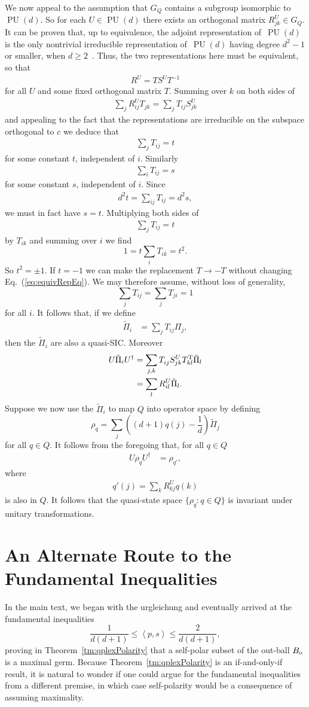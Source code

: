 \documentclass[aps,pra,superscriptaddress,10pt,tightenlines,twocolumn,nofootinbib]{revtex4}
\theoremstyle{remark}
\newcommand{\be}{\begin{equation}}
\newcommand{\ee}{\end{equation}}
\newcommand{\ea}[1]{\begin{align}#1\end{align}}
\newcommand{\vpu}[1]{^{\vphantom{#1}}}
\newcommand{\bo}{B_{\rm{o}}}
\newcommand{\qp}{Q}
\newcommand{\qgp}[1]{G_{#1}}
\newcommand{\inprod}[2]{{\left\langle #1 , #2 \right\rangle}}
\DeclareMathOperator{\PU}{PU}
\begin{document}
We now appeal to the assumption that $\qgp{\qp}$ contains a subgroup isomorphic to $\PU(d)$.  So for each $U\in \PU(d)$ there exists an orthogonal matrix $R^{U}_{jk} \in \qgp{\qp}$.  It can be proven that, up to equivalence, the adjoint representation of~$\PU(d)$ is the only nontrivial irreducible representation of~$\PU(d)$ having degree $d^2 - 1$ or smaller, when $d \geq 2$~\cite{GroupAlg}.  Thus, the two representations here must be equivalent, so that
\ea{
R^U = T S^U T^{-1}
\label{eq:equivRepEq}
}
for all $U$ and some fixed orthogonal matrix $T$.  Summing over $k$ on both sides of
\ea{
\sum_{j} R^U_{ij} T_{jk} = \sum_{j}T_{ij}S^U_{jk}
}
and appealing to the fact that the representations are irreducible on the subspace orthogonal to $c$ we deduce that
\ea{
\sum_{j} T_{ij} = t
}
for some constant $t$, independent of $i$.  Similarly
\ea{
\sum_{i} T_{ij} = s
}
for some constant $s$, independent of $i$.  Since
\ea{
d^2 t = \sum_{ij} T_{ij} = d^2 s,
}
we must in fact have $s=t$.  Multiplying both sides of
\ea{
\sum_j T_{ij} = t
}
by $T_{ik}$ and summing over $i$ we find
\be
1= t \sum_i T_{ik} = t^2.
\ee
So $t^2 = \pm 1$.  If $t=-1$ we can make the replacement $T\to -T$ without changing Eq.~(\ref{eq:equivRepEq}).  We may therefore assume, without loss of generality,
\be
\sum_j T_{ij} =\sum_j T_{ji} = 1
\ee
for all $i$.  It follows that, if we define
\ea{
\tilde{\Pi}_i &= \sum_{j} T_{ij} \Pi_j,
}
then the $\tilde{\Pi}_i$ are also a quasi-SIC.  Moreover
\ea{
U\tilde{\Pi}_i U^{\dagger} &=
  \sum_{j,k} T\vpu{U}_{ij} S^U_{jk} T^{\rm{T}}_{kl} \tilde{\Pi}_l
\nonumber
\\
&= \sum_{l} R^U_{il} \tilde{\Pi}_l.
}
Suppose we now use the $\tilde{\Pi}_i$ to map $\qp$ into operator space by defining
\be
\rho_q = \sum_j \left((d+1) q(j) -\frac{1}{d}\right) \tilde{\Pi}_j
\ee
for all $q\in \qp$.  It follows from the foregoing that, for all $q\in \qp$
\ea{
U\rho_q U^{\dagger} &= \rho_{q'},
}
where
\ea{
q'(j) =  \sum_k R^{U}_{kj}q(k)
}
is also in $\qp$.  It follows that the quasi-state space $\{\rho_q \colon q \in \qp\}$ is invariant under unitary transformations.

\section{An Alternate Route to the Fundamental Inequalities}

In the main text, we began with the urgleichung and eventually arrived at the fundamental inequalities
\begin{equation}
\frac{1}{d(d+1)} \leq \inprod{p}{s} \leq \frac{2}{d(d+1)},
\end{equation}
proving in Theorem~\ref{tm:qplexPolarity} that a self-polar subset of the out-ball $\bo$ is a maximal germ.  Because Theorem~\ref{tm:qplexPolarity} is an if-and-only-if result, it is natural to wonder if one could argue for the fundamental inequalities from a different premise, in which case self-polarity would be a consequence of assuming maximality.
\end{document}
